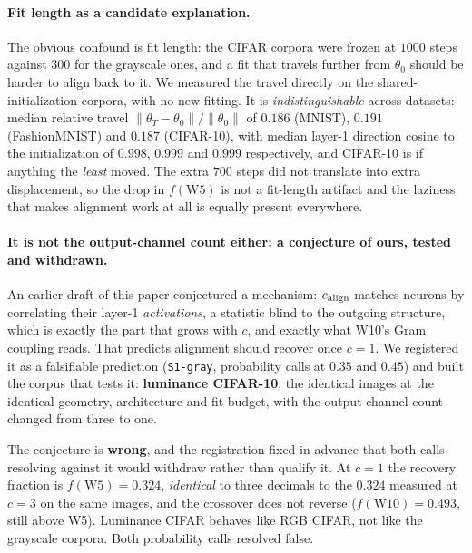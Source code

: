 \paragraph{Fit length as a candidate explanation.} The obvious confound is fit length: the
CIFAR corpora were frozen at $1000$ steps against $300$ for the grayscale ones, and a fit that
travels further from $\theta_0$ should be harder to align back to it. We measured the travel
directly on the shared-initialization corpora, with no new fitting. It is
\emph{indistinguishable} across datasets: median relative travel
$\|\theta_T - \theta_0\| / \|\theta_0\|$ of $0.186$ (MNIST), $0.191$ (FashionMNIST) and $0.187$
(CIFAR-10), with median layer-1 direction cosine to the initialization of $0.998$, $0.999$ and
$0.999$ respectively, and CIFAR-10 is if anything the \emph{least} moved. The extra $700$ steps did
not translate into extra displacement, so the drop in $f(\mathrm{W5})$ is not a fit-length
artifact and the laziness that makes alignment work at all is equally present everywhere.

\paragraph{It is not the output-channel count either: a conjecture of ours, tested and withdrawn.} An earlier draft of this paper conjectured a mechanism: $c_{\mathrm{align}}$ matches neurons by
correlating their layer-1 \emph{activations}, a statistic blind to the outgoing structure, which is exactly the part that grows with $c$, and exactly what W10's Gram coupling reads. That predicts
alignment should recover once $c=1$. We registered it as a falsifiable prediction
(\texttt{S1-gray}, probability calls at $0.35$ and $0.45$) and built the corpus that tests it:
\textbf{luminance CIFAR-10}, the identical images at the identical geometry, architecture and fit
budget, with the output-channel count changed from three to one.



The conjecture is \textbf{wrong}, and the registration fixed in advance that both calls resolving
against it would withdraw rather than qualify it. At $c=1$ the recovery fraction is $f(\mathrm{W5}) = 0.324$, \emph{identical} to three decimals to the $0.324$ measured at $c=3$ on the same images, and the crossover does not reverse ($f(\mathrm{W10}) = 0.493$, still above W5). Luminance CIFAR behaves like
RGB CIFAR, not like the grayscale corpora. Both probability calls resolved false.

